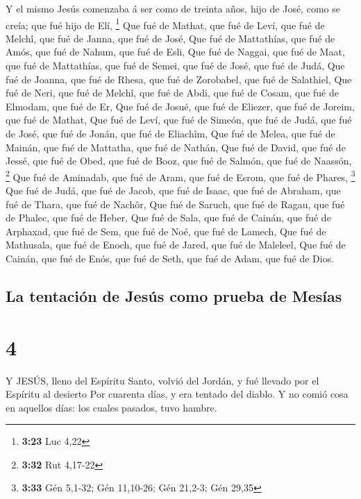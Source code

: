  Y el mismo Jesús comenzaba á ser como de treinta años,
hijo de José, como se creía; que fué hijo de Elí, \footnote{\textbf{3:23}
  Luc 4,22}  Que fué de Mathat, que fué de Leví, que fué de
Melchî, que fué de Janna, que fué de José,  Que fué de
Mattathías, que fué de Amós, que fué de Nahum, que fué de Esli,
 Que fué de Naggai, que fué de Maat, que fué de Mattathías,
que fué de Semei, que fué de José, que fué de Judá,  Que
fué de Joanna, que fué de Rhesa, que fué de Zorobabel, que fué de
Salathiel,  Que fué de Neri, que fué de Melchî, que fué de
Abdi, que fué de Cosam, que fué de Elmodam, que fué de Er, 
Que fué de Josué, que fué de Eliezer, que fué de Joreim, que fué de
Mathat,  Que fué de Leví, que fué de Simeón, que fué de
Judá, que fué de José, que fué de Jonán, que fué de Eliachîm,
 Que fué de Melea, que fué de Mainán, que fué de Mattatha,
que fué de Nathán,  Que fué de David, que fué de Jessé, que
fué de Obed, que fué de Booz, que fué de Salmón, que fué de Naassón,
\footnote{\textbf{3:32} Rut 4,17-22}  Que fué de Aminadab,
que fué de Aram, que fué de Esrom, que fué de Phares, \footnote{\textbf{3:33}
  Gén 5,1-32; Gén 11,10-26; Gén 21,2-3; Gén 29,35}  Que fué
de Judá, que fué de Jacob, que fué de Isaac, que fué de Abraham, que fué
de Thara, que fué de Nachôr,  Que fué de Saruch, que fué de
Ragau, que fué de Phalec, que fué de Heber,  Que fué de
Sala, que fué de Cainán, que fué de Arphaxad, que fué de Sem, que fué de
Noé, que fué de Lamech,  Que fué de Mathusala, que fué de
Enoch, que fué de Jared, que fué de Maleleel,  Que fué de
Cainán, que fué de Enós, que fué de Seth, que fué de Adam, que fué de
Dios.

\hypertarget{la-tentaciuxf3n-de-jesuxfas-como-prueba-de-mesuxedas}{%
\subsection{La tentación de Jesús como prueba de
Mesías}\label{la-tentaciuxf3n-de-jesuxfas-como-prueba-de-mesuxedas}}

\hypertarget{section-3}{%
\section{4}\label{section-3}}

 Y JESÚS, lleno del Espíritu Santo, volvió del Jordán, y fué
llevado por el Espíritu al desierto  Por cuarenta días, y
era tentado del diablo. Y no comió cosa en aquellos días: los cuales
pasados, tuvo hambre.

